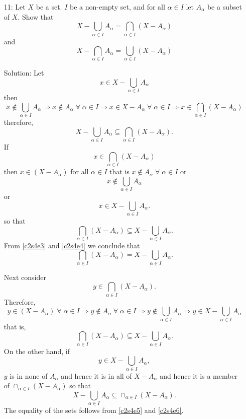 \begin{enumerate}
\item[11:] Let $X$ be a set. $I$ be a non-empty set, and for all $\alpha
\in I$ let $A_\alpha$ be a subset of $X$. Show that
\[
X - \bigcup_{\alpha \in I} A_\alpha = \bigcap_{\alpha \in I} (X - A_\alpha)
\]
and
\[
X - \bigcap_{\alpha \in I} A_\alpha = \bigcup_{\alpha \in I} (X - A_\alpha)
\]
\item[Solution:] Let
\[
x \in X - \bigcup_{\alpha \in I} A_\alpha
\]
then 
\[
x \notin \bigcup_{\alpha \in I} A_\alpha \Rightarrow x \notin A_\alpha
\;\forall\; \alpha \in I \Rightarrow x \in X - A_\alpha \;\forall\;
\alpha \in I \Rightarrow x \in \bigcap_{\alpha \in I}(X - A_\alpha)
\]
therefore,
\begin{equation}\label{c2s4e3}
X - \bigcup_{\alpha \in I} A_\alpha \subseteq \bigcap_{\alpha \in I}
(X - A_\alpha).
\end{equation}
If 
\[
x \in \bigcap_{\alpha \in I}(X - A_\alpha)
\]
then $x \in (X - A_\alpha)$ for all $\alpha \in I$ that is $x \notin 
A_\alpha \;\forall\; \alpha \in I$ or 
\[
x \notin \bigcup_{\alpha \in I} A_\alpha
\]
or
\[
x \in X - \bigcup_{\alpha \in I} A_\alpha.
\]
so that
\begin{equation}\label{c2s4e4}
\bigcap_{\alpha \in I}(X - A_\alpha) \subseteq X - \bigcup_{\alpha \in I} 
A_\alpha.
\end{equation}
From \eqref{c2s4e3} and \eqref{c2s4e4} we conclude that
\[
\bigcap_{\alpha \in I}(X - A_\alpha) = X - \bigcup_{\alpha \in I} 
A_\alpha.
\]

Next consider
\[
y \in \bigcap_{\alpha \in I}(X - A_\alpha).
\]
Therefore,
\[
y \in (X - A_\alpha) \;\forall\; \alpha \in I \Rightarrow y \notin
A_\alpha \;\forall\; \alpha \in I \Rightarrow y \notin \bigcup_{\alpha
\in I}A_\alpha \Rightarrow y \in X - \bigcup_{\alpha \in I}A_\alpha
\]
that is,
\begin{equation}\label{c2s4e5}
\bigcap_{\alpha \in I}(X - A_\alpha) \subseteq X - \bigcup_{\alpha \in I}
A_\alpha.
\end{equation}
On the other hand, if
\[
y \in X - \bigcup_{\alpha \in I}A_\alpha,
\]
$y$ is in none of $A_\alpha$ and hence it is in all of $X - A_\alpha$ and
hence it is a member of $\cap_{\alpha \in I}(X - A_\alpha)$ so that
\begin{equation}\label{c2s4e6}
X - \bigcup_{\alpha \in I}A_\alpha \subseteq \cap_{\alpha \in I}
(X - A_\alpha).
\end{equation}
The equality of the sets follows from \eqref{c2s4e5} and \eqref{c2s4e6}.
\end{enumerate}

